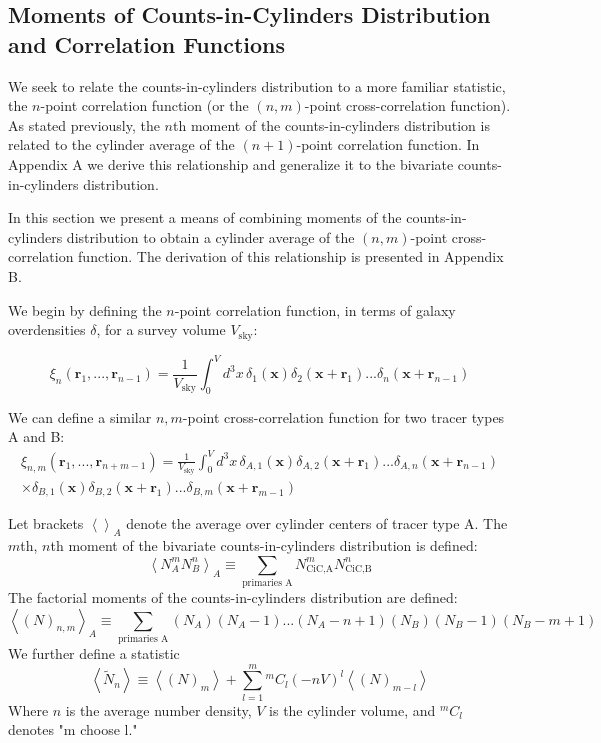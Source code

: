 \documentclass[fleqn,usenatbib]{mnras}
\newcommand*{\Comb}[2]{{}^{#1}C_{#2}}%
\begin{document}
\subsection*{Moments of Counts-in-Cylinders Distribution and Correlation Functions}
We seek to relate the counts-in-cylinders distribution to a more familiar statistic, the $n$-point correlation function (or the $(n,m)$-point cross-correlation function). As stated previously, the $n$th moment of the counts-in-cylinders distribution is related to the cylinder average of the $(n+1)$-point correlation function. In Appendix A we derive this relationship and generalize it to the bivariate counts-in-cylinders distribution.

In this section we present a means of combining moments of the counts-in-cylinders distribution to obtain a cylinder average of the $(n,m)$-point cross-correlation function. The derivation of this relationship is presented in Appendix B.

We begin by defining the $n$-point correlation function, in terms of galaxy overdensities $\delta$, for a survey volume $V_{\text{sky}}$:

\begin{equation}
   \xi_{n}(\mathbf{r}_1,...,\mathbf{r}_{n-1}) = \frac{1}{V_{\text{sky}}}\int_0^Vd^{3}x\,\delta_1(\mathbf{x})\delta_2(\mathbf{x}+\mathbf{r}_1)...\delta_n(\mathbf{x}+\mathbf{r}_{n-1}) 
\end{equation}


We can define a similar $n,m$-point cross-correlation function for two tracer types A and B:
\begin{multline}
   \xi_{n,m}(\mathbf{r}_1,...,\mathbf{r}_{n + m -1}) = \frac{1}{V_{\text{sky}}}\int_0^Vd^3x\,\delta_{A,1}(\mathbf{x})\delta_{A,2}(\mathbf{x}+\mathbf{r}_1)...\delta_{A,n}(\mathbf{x}+\mathbf{r}_{n-1}) \\
   \times \delta_{B,1}(\mathbf{x})\delta_{B,2}(\mathbf{x}+\mathbf{r}_1)...\delta_{B,m}(\mathbf{x}+\mathbf{r}_{m-1})   
\end{multline}

Let brackets $\left<\right>_A$ denote the average over cylinder centers of tracer type A. The $m$th, $n$th moment of the bivariate counts-in-cylinders distribution is defined:
\begin{equation}
\left<N_A^mN_B^n\right>_A \equiv \sum_{\text{primaries A}}N_{\text{CiC,A}}^mN_{\text{CiC,B}}^n
\end{equation}
The factorial moments of the counts-in-cylinders distribution are defined:
\begin{equation}
\left<(N)_{n,m}\right>_A \equiv \sum_{\text{primaries A}}(N_A)(N_A - 1) ... (N_A - n + 1)(N_B)(N_B - 1)(N_B - m + 1)
\end{equation}
We further define a statistic
\begin{equation}
\left<\tilde{N}_n\right> \equiv \left<(N)_m\right>+\sum_{l=1}^m \Comb{m}{l}(-nV)^l\left<(N)_{m-l}\right>
\end{equation}
Where $n$ is the average number density, $V$ is the cylinder volume, and $\Comb{m}{l}$ denotes "m choose l."
\end{document}

